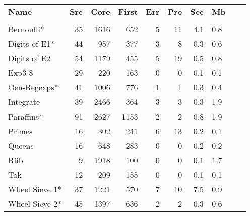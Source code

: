 \documentclass[preprint]{sigplanconf}
\begin{document}
\begin{table}
\begin{tabular*}{\linewidth}{lrrrrrrlll}
\hspace{-2mm} \textbf{Name} & \textbf{Src} & \textbf{Core} & \textbf{First} & \textbf{Err} & \textbf{Pre} & \textbf{Sec} & \textbf{Mb} \\
\vspace{-1ex} \\
\hspace{-2mm} Bernoulli*                   & 35 & 1616 &  652 & 5 & 11 & 4.1 & 0.8 \\
\hspace{-2mm} Digits of E1*  \hspace{-3mm} & 44 &  957 &  377 & 3 &  8 & 0.3 & 0.6 \\
\hspace{-2mm} Digits of E2   \hspace{-3mm} & 54 & 1179 &  455 & 5 & 19 & 0.5 & 0.8 \\
\hspace{-2mm} Exp3-8                       & 29 &  220 &  163 & 0 &  0 & 0.1 & 0.1 \\
\hspace{-2mm} Gen-Regexps*   \hspace{-3mm} & 41 & 1006 &  776 & 1 &  1 & 0.3 & 0.4 \\
\hspace{-2mm} Integrate                    & 39 & 2466 &  364 & 3 &  3 & 0.3 & 1.9 \\
\hspace{-2mm} Paraffins*                   & 91 & 2627 & 1153 & 2 &  2 & 0.8 & 1.9 \\
\hspace{-2mm} Primes                       & 16 &  302 &  241 & 6 & 13 & 0.2 & 0.1 \\
\hspace{-2mm} Queens                       & 16 &  648 &  283 & 0 &  0 & 0.2 & 0.2 \\
\hspace{-2mm} Rfib                         &  9 & 1918 &  100 & 0 &  0 & 0.1 & 1.7 \\
\hspace{-2mm} Tak                          & 12 &  209 &  155 & 0 &  0 & 0.1 & 0.1 \\
\hspace{-2mm} Wheel Sieve 1* \hspace{-3mm} & 37 & 1221 &  570 & 7 & 10 & 7.5 & 0.9 \\
\hspace{-2mm} Wheel Sieve 2* \hspace{-3mm} & 45 & 1397 &  636 & 2 &  2 & 0.3 & 0.6 \\

\end{tabular*}
\end{table}
\end{document}
